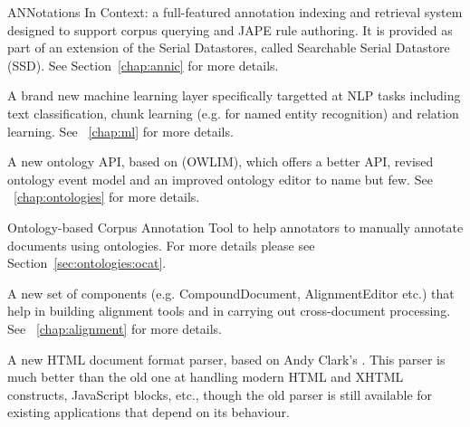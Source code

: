 %
%
%
%
%


ANNotations In Context: a full-featured annotation indexing and retrieval
system designed to support corpus querying and JAPE rule authoring.  It is
provided as part of an extension of the Serial Datastores, called Searchable
Serial Datastore (SSD). See Section~\ref{chap:annic} for more
details.

A brand new machine learning layer specifically targetted at NLP tasks
including text classification, chunk learning (e.g. for named entity
recognition) and relation learning.  See \Chapthing~\ref{chap:ml} for more
details.

A new ontology API, based on  (OWLIM), which offers a better API, revised ontology event model and
an improved ontology editor to name but few. See
\Chapthing~\ref{chap:ontologies} for more details.

Ontology-based Corpus Annotation Tool to help annotators to manually annotate
documents using ontologies. For more details please see
Section~\ref{sec:ontologies:ocat}.

A new set of components (e.g. CompoundDocument, AlignmentEditor etc.) that help
in building alignment tools and in carrying out cross-document processing.  See
\Chapthing~\ref{chap:alignment} for more details.

A new HTML document format parser, based on Andy Clark's
.  This parser
is much better than the old one at handling modern HTML and XHTML constructs,
JavaScript blocks, etc., though the old parser is still available for existing
applications that depend on its behaviour.

